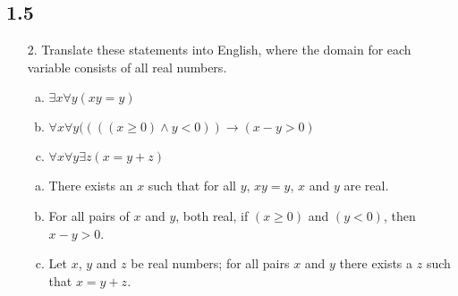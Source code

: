 \subsection{1.5}
\begin{itemize}
    \item[2.] Translate these statements into English, where the domain for each
          variable consists of all real numbers.
          \begin{enumerate}[a.]
              \item $\exists x \forall y (xy = y)$
              \item $\forall x \forall y ((((x \geq 0) \land y < 0)) \to (x - y > 0)$
              \item $\forall x \forall y \exists z (x = y + z)$
          \end{enumerate}
          \answer
          \begin{enumerate}[a.]
              \item There exists an $x$ such that for all $y$, $xy = y$, $x$ and $y$ are real.
              \item For all pairs of $x$ and $y$, both real, if $(x \geq 0)$ and $(y < 0)$, then $x - y > 0$.
              \item Let $x$, $y$ and $z$ be real numbers; for all pairs $x$ and $y$ there exists a $z$ such that $x = y + z$.
          \end{enumerate}


\end{itemize}

